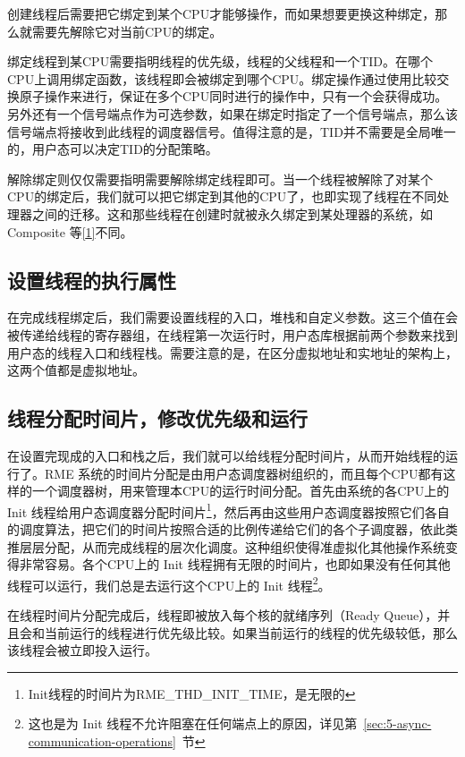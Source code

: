 创建线程后需要把它绑定到某个CPU才能够操作，而如果想要更换这种绑定，那么就需要先解除它对当前CPU的绑定。

绑定线程到某CPU需要指明线程的优先级，线程的父线程和一个TID。在哪个CPU上调用绑定函数，该线程即会被绑定到哪个CPU。绑定操作通过使用比较交换原子操作来进行，保证在多个CPU同时进行的操作中，只有一个会获得成功。另外还有一个信号端点作为可选参数，如果在绑定时指定了一个信号端点，那么该信号端点将接收到此线程的调度器信号。值得注意的是，TID并不需要是全局唯一的，用户态可以决定TID的分配策略。

解除绑定则仅仅需要指明需要解除绑定线程即可。当一个线程被解除了对某个CPU的绑定后，我们就可以把它绑定到其他的CPU了，也即实现了线程在不同处理器之间的迁移。这和那些线程在创建时就被永久绑定到某处理器的系统，如 Composite 等\hyperref[cite:4-1]{{[}1{]}}不同。

\subsection{设置线程的执行属性}\label{subsec:4-thread-execution-attributes}

在完成线程绑定后，我们需要设置线程的入口，堆栈和自定义参数。这三个值在会被传递给线程的寄存器组，在线程第一次运行时，用户态库根据前两个参数来找到用户态的线程入口和线程栈。需要注意的是，在区分虚拟地址和实地址的架构上，这两个值都是虚拟地址。

\subsection{线程分配时间片，修改优先级和运行}\label{subsec:4-thread-time-slice-allocation-priority-change-and-run}

在设置完现成的入口和栈之后，我们就可以给线程分配时间片，从而开始线程的运行了。RME 系统的时间片分配是由用户态调度器树组织的，而且每个CPU都有这样的一个调度器树，用来管理本CPU的运行时间分配。首先由系统的各CPU上的 Init 线程给用户态调度器分配时间片\footnote{Init线程的时间片为RME\_THD\_INIT\_TIME，是无限的}，然后再由这些用户态调度器按照它们各自的调度算法，把它们的时间片按照合适的比例传递给它们的各个子调度器，依此类推层层分配，从而完成线程的层次化调度。这种组织使得准虚拟化其他操作系统变得非常容易。各个CPU上的 Init 线程拥有无限的时间片，也即如果没有任何其他线程可以运行，我们总是去运行这个CPU上的 Init 线程\footnote{这也是为 Init 线程不允许阻塞在任何端点上的原因，详见第~\ref{sec:5-async-communication-operations}~节}。

在线程时间片分配完成后，线程即被放入每个核的就绪序列（Ready
Queue），并且会和当前运行的线程进行优先级比较。如果当前运行的线程的优先级较低，那么该线程会被立即投入运行。

